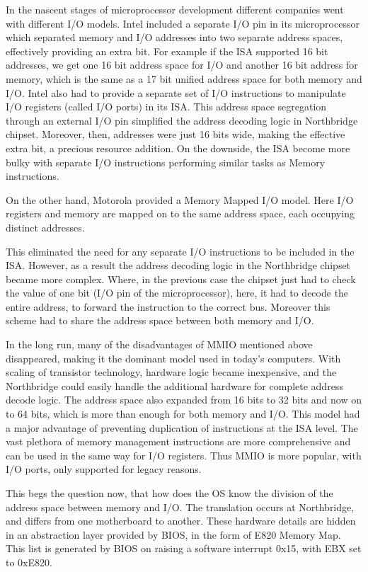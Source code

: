 In the nascent stages of microprocessor development different companies went with different I/O models. Intel included a separate I/O pin in its microprocessor which separated memory and I/O addresses into two separate address spaces, effectively providing an extra bit. For example if the ISA supported 16 bit addresses, we get one 16 bit address space for I/O and another 16 bit address for memory, which is the same as a 17 bit unified address space for both memory and I/O. Intel also had to provide a separate set of I/O instructions to manipulate I/O registers (called I/O ports) in its ISA. This address space segregation through an external I/O pin simplified the address decoding logic in Northbridge chipset. Moreover, then, addresses were just 16 bits wide, making the effective extra bit, a precious resource addition. On the downside, the ISA become more bulky with separate I/O instructions performing similar tasks as Memory instructions. 

On the other hand, Motorola provided a Memory Mapped I/O model. Here I/O registers and memory are mapped on to the same address space, each occupying distinct addresses.  

This eliminated the need for any separate I/O instructions to be included in the ISA. However, as a result the address decoding logic in the Northbridge chipset became more complex. Where, in the previous case the chipset just had to check the value of one bit (I/O pin of the microprocessor), here, it had to decode the entire address, to forward the instruction to the correct bus. Moreover this scheme had to share the address space between both memory and I/O. 

In the long run, many of the disadvantages of MMIO mentioned above disappeared, making it the dominant model used in today's computers. With scaling of transistor technology, hardware logic became inexpensive, and the Northbridge could easily handle the additional hardware for complete address decode logic. The address space also expanded from 16 bits to 32 bits and now on to 64 bits, which is more than enough for both memory and I/O. This model had a major advantage of preventing duplication of instructions at the ISA level. The vast plethora of memory management instructions are more comprehensive and can be used in the same way for I/O registers. Thus MMIO is more popular, with I/O ports, only supported for legacy reasons. 

This begs the question now, that how does the OS know the division of the address space between memory and I/O. The translation occurs at Northbridge, and differs from one motherboard to another. These hardware details are hidden in an abstraction layer provided by BIOS, in the form of E820 Memory Map. This list is generated by BIOS on raising a software interrupt 0x15, with EBX set to 0xE820. 

